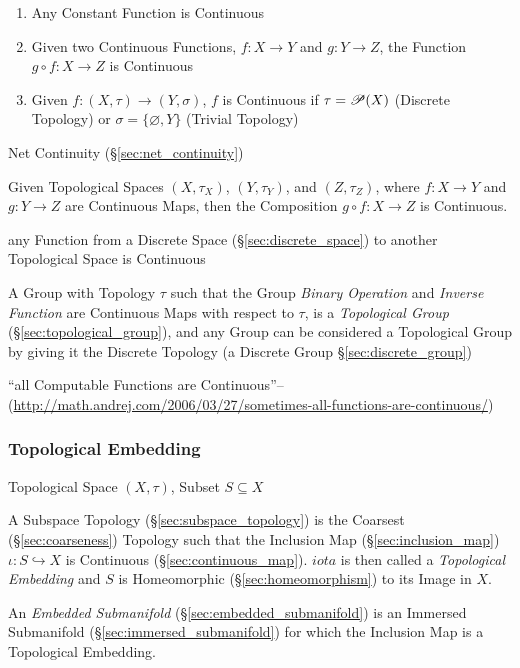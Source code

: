 \begin{enumerate}
  \item Any Constant Function is Continuous
  \item Given two Continuous Functions, $f : X \rightarrow Y$ and $g
    : Y \rightarrow Z$, the Function $g \circ f : X \rightarrow Z$ is
    Continuous
  \item Given $f : (X, \tau) \rightarrow (Y, \sigma)$, $f$ is
    Continuous if $\tau = \mathscr{P}(X)$ (Discrete Topology) or
    $\sigma = \{\varnothing, Y\}$ (Trivial Topology)
\end{enumerate}

Net Continuity (\S\ref{sec:net_continuity})

Given Topological Spaces $(X, \tau_X)$, $(Y, \tau_Y)$, and $(Z,
\tau_Z)$, where $f: X \rightarrow Y$ and $g: Y \rightarrow Z$ are
Continuous Maps, then the Composition $g \circ f : X \rightarrow Z$ is
Continuous.

any Function from a Discrete Space (\S\ref{sec:discrete_space}) to another
Topological Space is Continuous

A Group with Topology $\tau$ such that the Group \emph{Binary Operation} and
\emph{Inverse Function} are Continuous Maps with respect to $\tau$, is a
\emph{Topological Group} (\S\ref{sec:topological_group}), and any Group can be
considered a Topological Group by giving it the Discrete Topology (a Discrete
Group \S\ref{sec:discrete_group})

``all Computable Functions are Continuous''--
(\url{http://math.andrej.com/2006/03/27/sometimes-all-functions-are-continuous/})



\subsubsection{Topological Embedding}\label{sec:topological_embedding}

Topological Space $(X,\tau)$, Subset $S \subseteq X$

A Subspace Topology (\S\ref{sec:subspace_topology}) is the Coarsest
(\S\ref{sec:coarseness}) Topology such that the Inclusion Map
(\S\ref{sec:inclusion_map}) $\iota : S \hookrightarrow X$ is
Continuous (\S\ref{sec:continuous_map}). $iota$ is then called a
\emph{Topological Embedding} and $S$ is Homeomorphic
(\S\ref{sec:homeomorphism}) to its Image in $X$.

An \emph{Embedded Submanifold} (\S\ref{sec:embedded_submanifold}) is an
Immersed Submanifold (\S\ref{sec:immersed_submanifold}) for which the Inclusion
Map is a Topological Embedding.



